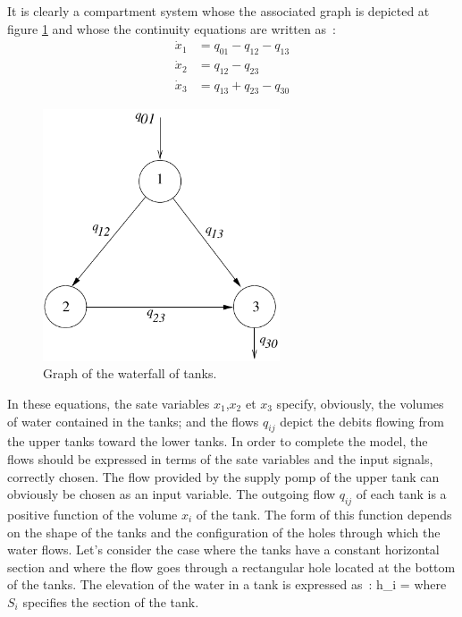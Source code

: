 \begin{exemple}
It is clearly a compartment system whose the associated graph 
is depicted at figure \ref{Fig:grafassoc} and whose the continuity 
equations are written as~:
\begin{equation*} \begin{split} 
\dot x_1 &= q_{01} - q_{12} - q_{13} \\
\dot x_2 &=  q_{12} - q_{23} \\
\dot x_3 &= q_{13} + q_{23} - q_{30} 
\end{split} \end{equation*}
\begin{figure}[h] 
\begin{center}
\includegraphics[width=7cm]{images/grafassoc.pdf}
\caption{Graph of the waterfall of tanks.}
\label{Fig:grafassoc}
\end{center} 
\end{figure}
In these equations, the sate variables $x_1$,$ x_2$ et $x_3$ specify, 
obviously, the volumes of water contained in the tanks; and the flows 
$q_{ij}$ depict the debits flowing from the upper tanks toward the lower 
tanks. In order to complete the model, the flows should be expressed in
terms of the sate variables and the input signals, correctly chosen.
The flow provided by the supply pomp of the upper tank can obviously be 
chosen as an input variable. The outgoing flow $q_{ij}$ of each tank 
is a positive function of the volume $x_i$ of the tank. The form of 
this function depends on the shape of the tanks and the configuration of 
the holes through which the water flows. Let's consider the case where the tanks 
have a constant horizontal section and where the flow goes through a 
rectangular hole located at the bottom of the tanks. The elevation of the water in 
a tank is expressed as~:
\eqnn
h_i = 
\eeqnn
where $S_{i}$ specifies the section of the tank.

\end{exemple}
